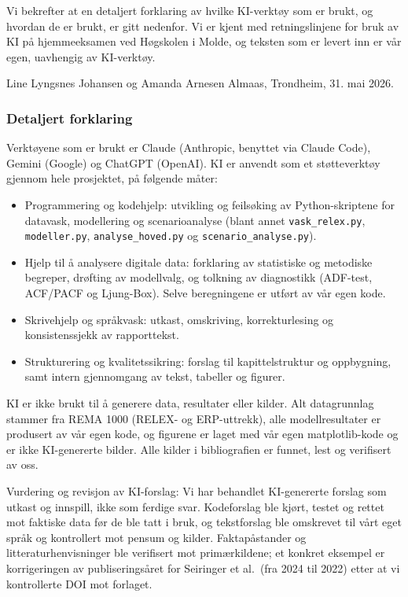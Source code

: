 \documentclass[
  norsk,
  11pt,
  a4paper,
]{article}
\providecommand{\tightlist}{%
  \setlength{\itemsep}{0pt}\setlength{\parskip}{0pt}}
\begin{document}
Vi bekrefter at en detaljert forklaring av hvilke KI-verktøy som er
brukt, og hvordan de er brukt, er gitt nedenfor. Vi er kjent med
retningslinjene for bruk av KI på hjemmeeksamen ved Høgskolen i Molde,
og teksten som er levert inn er vår egen, uavhengig av KI-verktøy.

Line Lyngsnes Johansen og Amanda Arnesen Almaas, Trondheim, 31. mai
2026.

\subsubsection{Detaljert forklaring}\label{detaljert-forklaring}

Verktøyene som er brukt er Claude (Anthropic, benyttet via Claude Code),
Gemini (Google) og ChatGPT (OpenAI). KI er anvendt som et støtteverktøy
gjennom hele prosjektet, på følgende måter:

\begin{itemize}
\tightlist
\item
  Programmering og kodehjelp: utvikling og feilsøking av
  Python-skriptene for datavask, modellering og scenarioanalyse (blant
  annet \texttt{vask\_relex.py}, \texttt{modeller.py},
  \texttt{analyse\_hoved.py} og \texttt{scenario\_analyse.py}).
\item
  Hjelp til å analysere digitale data: forklaring av statistiske og
  metodiske begreper, drøfting av modellvalg, og tolkning av diagnostikk
  (ADF-test, ACF/PACF og Ljung-Box). Selve beregningene er utført av vår
  egen kode.
\item
  Skrivehjelp og språkvask: utkast, omskriving, korrekturlesing og
  konsistenssjekk av rapporttekst.
\item
  Strukturering og kvalitetssikring: forslag til kapittelstruktur og
  oppbygning, samt intern gjennomgang av tekst, tabeller og figurer.
\end{itemize}

KI er ikke brukt til å generere data, resultater eller kilder. Alt
datagrunnlag stammer fra REMA 1000 (RELEX- og ERP-uttrekk), alle
modellresultater er produsert av vår egen kode, og figurene er laget med
vår egen matplotlib-kode og er ikke KI-genererte bilder. Alle kilder i
bibliografien er funnet, lest og verifisert av oss.

Vurdering og revisjon av KI-forslag: Vi har behandlet KI-genererte
forslag som utkast og innspill, ikke som ferdige svar. Kodeforslag ble
kjørt, testet og rettet mot faktiske data før de ble tatt i bruk, og
tekstforslag ble omskrevet til vårt eget språk og kontrollert mot pensum
og kilder. Faktapåstander og litteraturhenvisninger ble verifisert mot
primærkildene; et konkret eksempel er korrigeringen av publiseringsåret
for Seiringer et al.~(fra 2024 til 2022) etter at vi kontrollerte DOI
mot forlaget.
\end{document}
